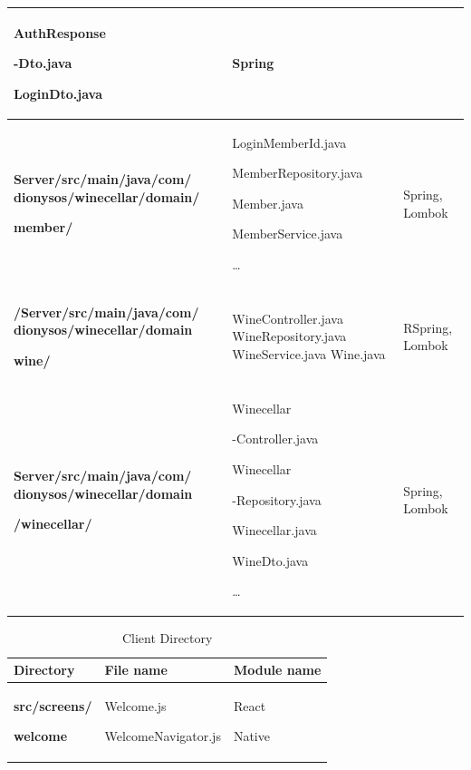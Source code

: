 \documentclass[sigconf, nonacm]{acmart}
\begin{document}
\begin {enumerate}
\begin{table}[ht!]
\begin{center}
\begin{tabular}{|p{4.3cm}|p{2.95cm}|p{1.3cm}|}
  AuthResponse \par -Dto.java \par
  LoginDto.java

 & Spring\\
  \hline
 \textbf{Server/src/main/java/com/
 dionysos/winecellar/domain/} \par \textbf {member/}& LoginMemberId.java

MemberRepository.java

Member.java

MemberService.java \par
…

& Spring,
Lombok
 \\
\hline
  \textbf{/Server/src/main/java/com/
  dionysos/winecellar/domain} \par \textbf{wine/} & WineController.java
WineRepository.java
WineService.java
Wine.java

 & RSpring,
Lombok
 \\
  \hline
  \textbf{Server/src/main/java/com/
  dionysos/winecellar/domain} \par \textbf{/winecellar/} & Winecellar \par -Controller.java
  \par Winecellar \par -Repository.java

Winecellar.java

WineDto.java \par
…

 & Spring,
Lombok
\\
  \hline
\end{tabular}
\end{center}
\end{table}


\begin{table}[ht!] \renewcommand\arraystretch{1.25}
\caption{Client Directory}
    \begin{center}
        \begin{tabular}{|p{2.7cm}|p{3.4cm}|p{1.3cm}|}
        \hline
        \textbf{Directory}& \textbf{File name} & \textbf{Module name} \\
        
        \hline
        \textbf{src/screens/} \par \textbf{welcome} & Welcome.js
        
        WelcomeNavigator.js & React \par Native\\
        \hline
        

\end{tabular}
\end{center}
\end{table}
\end{enumerate}
\end{document}

